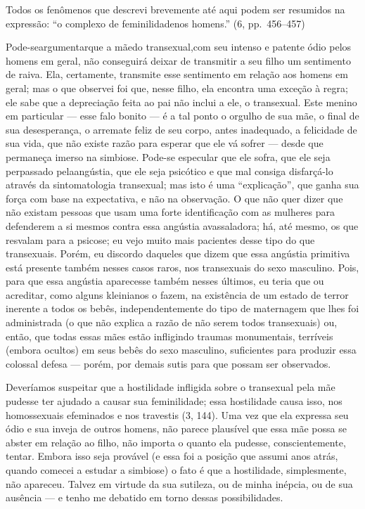 Todos os fenômenos que descrevi brevemente até aqui podem ser
resumidos na expressão: ``o complexo de feminilidade\idxcompl[|)] nos
homens.'' (6, pp.~456--457)


Pode-se\idxtransesimb[|(] argumentar\idxmaestran[|(] que a mãe\idxmaesfilh[|(] 
do transexual,\idxhostmaes[|(] com seu intenso e
patente ódio pelos homens em geral, não conseguirá deixar de transmitir
a seu filho um sentimento de raiva. Ela, certamente, transmite esse
sentimento em relação aos homens em geral; mas o que observei foi que,
nesse filho, ela encontra uma exceção à regra; ele sabe que a
depreciação feita ao pai não inclui a ele, o transexual. Este menino em
particular --- esse falo bonito\idxmaesfalo{} --- é a tal ponto o orgulho de sua
mãe, o final de sua desesperança, o arremate feliz de seu corpo, antes
inadequado, a felicidade de sua vida, que não existe razão para esperar
que ele vá sofrer --- desde que permaneça imerso na simbiose. Pode-se
especular que ele sofra, que ele seja perpassado pela\idxangushos[|(] angústia,\idxanguinfa{} que ele
seja psicótico e que mal consiga disfarçá-lo através da sintomatologia
transexual; mas isto é uma ``explicação'',
que ganha sua força com base na expectativa, e não na observação. O que
não quer dizer que não existam pessoas que usam uma forte identificação
com as mulheres para defenderem a si mesmos contra essa angústia
avassaladora; há, até mesmo, os que resvalam para a psicose; eu vejo
muito mais pacientes desse tipo do que transexuais. Porém, eu discordo
daqueles que dizem que essa angústia primitiva está presente também
nesses casos raros, nos transexuais do sexo masculino. Pois, para que
essa angústia aparecesse também nesses últimos, eu teria que ou
acreditar, como alguns kleinianos\idxklein{} o fazem, na existência de um estado
de terror inerente a todos os bebês, independentemente do tipo de
maternagem\idxhomosexpe{} que lhes foi administrada (o que não explica a razão de não
serem todos transexuais) ou, então, que todas essas mães estão
infligindo traumas monumentais, terríveis (embora ocultos) em seus
bebês do sexo masculino, suficientes para produzir essa colossal
defesa --- porém, por demais sutis para que possam ser observados.

Deveríamos suspeitar que a\idxmaeshost{} hostilidade\idxinfanangu{} infligida sobre o transexual
pela mãe\idxmaeshomo{} pudesse ter ajudado a causar sua feminilidade; essa
hostilidade causa isso, nos homossexuais efeminados e nos travestis (3,
144). Uma vez que ela expressa seu ódio e sua inveja de outros homens,
não parece plausível que essa mãe possa se abster em relação ao filho,
não importa o quanto ela pudesse, conscientemente, tentar. Embora isso
seja provável (e essa foi a posição que assumi anos atrás, quando
comecei a estudar a simbiose) o fato é que a hostilidade, simplesmente,
não apareceu. Talvez em virtude da sua sutileza, ou de minha inépcia,
ou de sua ausência --- e tenho me debatido em torno dessas
possibilidades.

